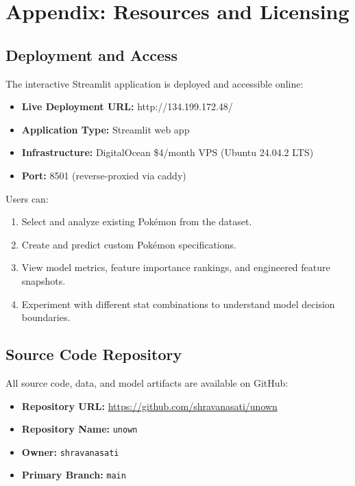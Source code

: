 \appendix

\chapter{Appendix: Resources and Licensing}
\label{app:resources}

\section{Deployment and Access}
\label{app:deployment}

The interactive Streamlit application is deployed and accessible online:

\begin{itemize}
  \item \textbf{Live Deployment URL:} http://134.199.172.48/
  \item \textbf{Application Type:} Streamlit web app
  \item \textbf{Infrastructure:} DigitalOcean \$4/month VPS (Ubuntu 24.04.2 LTS)
  \item \textbf{Port:} 8501 (reverse-proxied via caddy)
\end{itemize}

Users can:
\begin{enumerate}
  \item Select and analyze existing Pokémon from the dataset.
  \item Create and predict custom Pokémon specifications.
  \item View model metrics, feature importance rankings, and engineered feature snapshots.
  \item Experiment with different stat combinations to understand model decision boundaries.
\end{enumerate}

\section{Source Code Repository}
\label{app:repository}

All source code, data, and model artifacts are available on GitHub:

\begin{itemize}
  \item \textbf{Repository URL:} \url{https://github.com/shravanasati/unown}
  \item \textbf{Repository Name:} \texttt{unown}
  \item \textbf{Owner:} \texttt{shravanasati}
  \item \textbf{Primary Branch:} \texttt{main}
\end{itemize}

